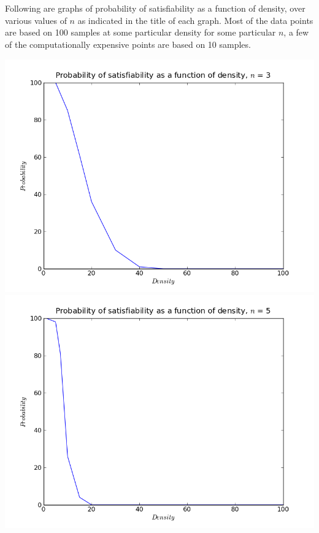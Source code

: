 \documentclass{article}
\begin{document}
\section{}
Following are graphs of probability of satisfiability as a function of density,
over various values of $n$ as indicated in the title of each graph. Most of the
data points are based on 100 samples at some particular density for some
particular $n$, a few of the computationally expensive points are based on 10
samples.

\includegraphics[scale=0.5]{probn3.png}
\includegraphics[scale=0.5]{probn5.png}
\end{document}
